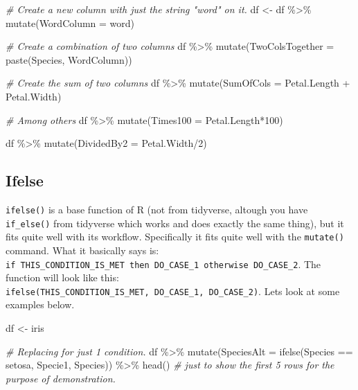 \documentclass[
]{book}
\newenvironment{Shaded}{\begin{snugshade}}{\end{snugshade}}
\newcommand{\AttributeTok}[1]{\textcolor[rgb]{0.77,0.63,0.00}{#1}}
\newcommand{\CommentTok}[1]{\textcolor[rgb]{0.56,0.35,0.01}{\textit{#1}}}
\newcommand{\DecValTok}[1]{\textcolor[rgb]{0.00,0.00,0.81}{#1}}
\newcommand{\FunctionTok}[1]{\textcolor[rgb]{0.00,0.00,0.00}{#1}}
\newcommand{\NormalTok}[1]{#1}
\newcommand{\OtherTok}[1]{\textcolor[rgb]{0.56,0.35,0.01}{#1}}
\newcommand{\SpecialCharTok}[1]{\textcolor[rgb]{0.00,0.00,0.00}{#1}}
\newcommand{\StringTok}[1]{\textcolor[rgb]{0.31,0.60,0.02}{#1}}
\begin{document}
\begin{Shaded}
\begin{Highlighting}[]
\CommentTok{\# Create a new column with just the string "word" on it.}
\NormalTok{df }\OtherTok{\textless{}{-}}\NormalTok{ df }\SpecialCharTok{\%\textgreater{}\%} 
  \FunctionTok{mutate}\NormalTok{(}\AttributeTok{WordColumn =} \StringTok{\textquotesingle{}word\textquotesingle{}}\NormalTok{) }

\CommentTok{\# Create a combination of two columns}
\NormalTok{df }\SpecialCharTok{\%\textgreater{}\%} 
  \FunctionTok{mutate}\NormalTok{(}\AttributeTok{TwoColsTogether =} \FunctionTok{paste}\NormalTok{(Species, WordColumn))}

\CommentTok{\# Create the sum of two columns}
\NormalTok{df }\SpecialCharTok{\%\textgreater{}\%} 
  \FunctionTok{mutate}\NormalTok{(}\AttributeTok{SumOfCols =}\NormalTok{ Petal.Length }\SpecialCharTok{+}\NormalTok{ Petal.Width)}

\CommentTok{\# Among others}
\NormalTok{df }\SpecialCharTok{\%\textgreater{}\%} 
  \FunctionTok{mutate}\NormalTok{(}\AttributeTok{Times100 =}\NormalTok{ Petal.Length}\SpecialCharTok{*}\DecValTok{100}\NormalTok{)}

\NormalTok{df }\SpecialCharTok{\%\textgreater{}\%} 
  \FunctionTok{mutate}\NormalTok{(}\AttributeTok{DividedBy2 =}\NormalTok{ Petal.Width}\SpecialCharTok{/}\DecValTok{2}\NormalTok{)}
\end{Highlighting}
\end{Shaded}

\hypertarget{ifelse}{%
\subsection{Ifelse}\label{ifelse}}

\texttt{ifelse()} is a base function of R (not from tidyverse, altough you have \texttt{if\_else()} from tidyverse which works and does exactly the same thing), but it fits quite well with its workflow.
Specifically it fits quite well with the \texttt{mutate()} command.
What it basically says is: \texttt{if\ THIS\_CONDITION\_IS\_MET\ then\ DO\_CASE\_1\ otherwise\ DO\_CASE\_2}.
The function will look like this: \texttt{ifelse(THIS\_CONDITION\_IS\_MET,\ DO\_CASE\_1,\ DO\_CASE\_2)}.
Lets look at some examples below.

\begin{Shaded}
\begin{Highlighting}[]
\NormalTok{df }\OtherTok{\textless{}{-}}\NormalTok{ iris}

\CommentTok{\# Replacing for just 1 condition.}
\NormalTok{df }\SpecialCharTok{\%\textgreater{}\%} 
  \FunctionTok{mutate}\NormalTok{(}\AttributeTok{SpeciesAlt =} \FunctionTok{ifelse}\NormalTok{(Species }\SpecialCharTok{==} \StringTok{\textquotesingle{}setosa\textquotesingle{}}\NormalTok{, }\StringTok{\textquotesingle{}Specie1\textquotesingle{}}\NormalTok{, Species)) }\SpecialCharTok{\%\textgreater{}\%} 
  \FunctionTok{head}\NormalTok{()  }\CommentTok{\# just to show the first 5 rows for the purpose of demonstration.}
\end{Highlighting}
\end{Shaded}
\end{document}
